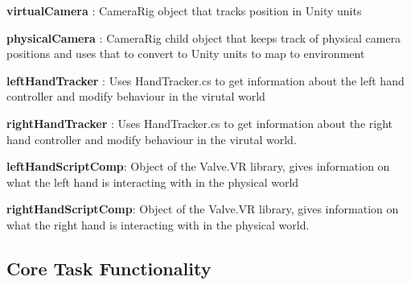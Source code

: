 \documentclass{article}
\begin{document}
\textbf{virtualCamera} : CameraRig object that tracks position in Unity units

\textbf{physicalCamera} : CameraRig child object that keeps track of physical camera positions and uses that to convert to Unity units to map to environment

\textbf{leftHandTracker} : Uses HandTracker.cs to get information about the left hand controller and modify behaviour in the virutal world

\textbf{rightHandTracker} : Uses HandTracker.cs to get information about the right hand controller and modify behaviour in the virutal world.

\textbf{leftHandScriptComp}: Object of the Valve.VR library, gives information on what the left hand is interacting with in the physical world

\textbf{rightHandScriptComp}: Object of the Valve.VR library, gives information on what the right hand is interacting with in the physical world.



\subsection{Core Task Functionality} %
\end{document}
